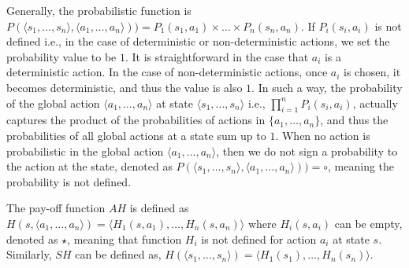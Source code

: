 Generally, the probabilistic function is 
$P(\langle s_1,\ldots, s_n\rangle, \langle a_1, \ldots, a_n\rangle))=P_1(s_1, a_1) \times \ldots \times P_n(s_n, a_n)$.
If $P_i(s_i, a_i)$ is not defined i.e., in the case of deterministic or non-deterministic actions, we set the probability value to be $1$.
It is straightforward in the case that $a_i$ is a deterministic action. In the case of non-deterministic actions, once $a_i$ is chosen, it becomes deterministic, and thus the value is also $1$. 
In such a way, the probability of the global action $\langle a_1, \ldots, a_n\rangle$ at state $\langle s_1,\ldots, s_n\rangle$ 
i.e., $\prod_{i=1}^{n}P_i(s_i, a_i)$, actually captures the product of the probabilities of actions in $\{a_1, \ldots, a_n\}$,
and thus the probabilities of all global actions at a state sum up to $1$. When no action is probabilistic in the global 
action $\langle a_1, \ldots, a_n\rangle$, then we do not sign a probability to the action at the state, denoted as $P(\langle s_1,\ldots, s_n\rangle, \langle a_1, \ldots, a_n\rangle))=\circ$, meaning the probability is not defined.

The pay-off function $AH$ is defined as
$H(s,\langle a_1,\ldots, a_n\rangle)=\langle H_1(s,a_1), \ldots, H_n(s,a_n)\rangle$
where $H_i(s,a_i)$ can be empty, denoted as $\star$, meaning that function $H_i$
is not defined for action $a_i$ at state $s$. Similarly, $SH$ can be defined as,
$H(\langle s_1,\ldots, s_n\rangle)=\langle H_1(s_1), \ldots, H_n(s_n)\rangle$.

